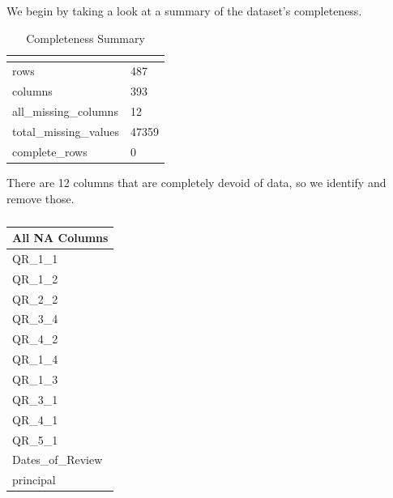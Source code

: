 \documentclass[
  man,floatsintext]{apa6}
\begin{document}
We begin by taking a look at a summary of the dataset's completeness.

\begin{table}[H]

\begin{center}
\begin{threeparttable}

\caption{\label{tab:data2}Completeness Summary}

\begin{tabular}{ll}
\toprule
 & \multicolumn{1}{c}{}\\
\midrule
rows & 487\\
columns & 393\\
all\_missing\_columns & 12\\
total\_missing\_values & 47359\\
complete\_rows & 0\\
\bottomrule
\end{tabular}

\end{threeparttable}
\end{center}

\end{table}

There are 12 columns that are completely devoid of data, so we identify and remove those.

\begin{table}[H]

\begin{center}
\begin{threeparttable}

\caption{\label{tab:unnamed-chunk-2}}

\begin{tabular}{l}
\toprule
All NA Columns\\
\midrule
QR\_1\_1\\
QR\_1\_2\\
QR\_2\_2\\
QR\_3\_4\\
QR\_4\_2\\
QR\_1\_4\\
QR\_1\_3\\
QR\_3\_1\\
QR\_4\_1\\
QR\_5\_1\\
Dates\_of\_Review\\
principal\\
\bottomrule
\end{tabular}

\end{threeparttable}
\end{center}

\end{table}
\end{document}
